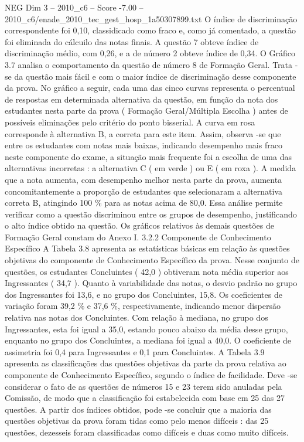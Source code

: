 \begin{textsample}{NEG Dim 3 – 2010\_c6 – Score -7.00 – 2010\_c6/enade\_2010\_tec\_gest\_hosp\_1a50307899.txt}
O índice de discriminação correspondente foi 0,10, classidicado como fraco e, como já comentado, a questão foi eliminada do cálcuilo das notas finais.
A questão 7 obteve índice de discriminação médio, com 0,26, e a de número 2 obteve índice de 0,34.
O Gráfico 3.7 analisa o comportamento da questão de número 8 de Formação Geral.
Trata -se da questão mais fácil e com o maior índice de discriminação desse componente da prova.
No gráfico a seguir, cada uma das cinco curvas representa o percentual de respostas em determinada alternativa da questão, em função da nota dos estudantes nesta parte da prova ( Formação Geral/Múltipla Escolha ) antes de possíveis eliminações pelo critério do ponto bisserial.
A curva em rosa corresponde à alternativa B, a correta para este item.
Assim, observa -se que entre os estudantes com notas mais baixas, indicando desempenho mais fraco neste componente do exame, a situação mais frequente foi a escolha de uma das alternativas incorretas : a alternativa C ( em verde ) ou E ( em roxa ).
A medida que a nota aumenta, com desempenho melhor nesta parte da prova, aumenta concomitantemente a proporção de estudantes que selecionaram a alternativa correta B, atingindo 100 \% para as notas acima de 80,0.
Essa análise permite verificar como a questão discriminou entre os grupos de desempenho, justificando o alto índice obtido na questão.
Os gráficos relativos às demais questões de Formação Geral constam do Anexo I. 3.2.2 Componente de Conhecimento Específico A Tabela 3.8 apresenta as estatísticas básicas em relação às questões objetivas do componente de Conhecimento Específico da prova.
Nesse conjunto de questões, os estudantes Concluintes ( 42,0 ) obtiveram nota média superior aos Ingressantes ( 34,7 ).
Quanto à variabilidade das notas, o desvio padrão no grupo dos Ingressantes foi 13,6, e no grupo dos Concluintes, 15,8.
Os coeficientes de variação foram 39,2 \% e 37,6 \%, respectivamente, indicando menor dispersão relativa nas notas dos Concluintes.
Com relação à mediana, no grupo dos Ingressantes, esta foi igual a 35,0, estando pouco abaixo da média desse grupo, enquanto no grupo dos Concluintes, a mediana foi igual a 40,0.
O coeficiente de assimetria foi 0,4 para Ingressantes e 0,1 para Concluintes.
A Tabela 3.9 apresenta as classificações das questões objetivas da parte da prova relativa ao componente de Conhecimento Específico, segundo o índice de facilidade.
Deve -se considerar o fato de as questões de números 15 e 23 terem sido anuladas pela Comissão, de modo que a classificação foi estabelecida com base em 25 das 27 questões.
A partir dos índices obtidos, pode -se concluir que a maioria das questões objetivas da prova foram tidas como pelo menos difíceis : das 25 questões, dezesseis foram classificadas como difíceis e duas como muito difíceis.

\end{textsample}
